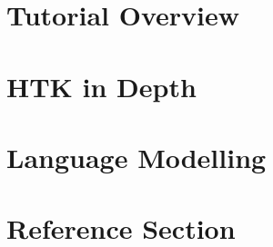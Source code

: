 \documentclass[a4paper,oneside]{book}
\begin{document}
\newpage
\tableofcontents

\newpage
\pagestyle{myheadings}

\part{Tutorial Overview}




\part{HTK in Depth}











\part{Language Modelling}




\part{Reference Section}






































   
\clearpage
{}
\printindex
\end{document}
